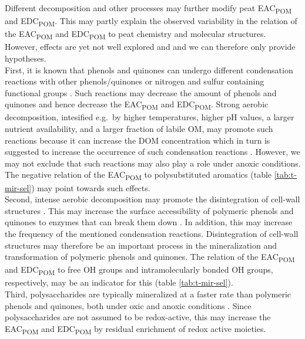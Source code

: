\documentclass[alpha-refs]{wiley-article-rmd}
\begin{document}
\begin{refsection}
Different decomposition and other processes may further modify peat EAC\textsubscript{POM} and EDC\textsubscript{POM}. This may partly explain the observed variability in the relation of the EAC\textsubscript{POM} and EDC\textsubscript{POM} to peat chemistry and molecular structures. However, effects are yet not well explored and and we can therefore only provide hypotheses.\\
First, it is known that phenols and quinones can undergo different condensation reactions with other phenols/quinones \autocite{Hotta.2002,Johnson.2015,Bolton.2018,Zhao.2020} or nitrogen and sulfur containing functional groups \autocite{Bolton.2018,Olk.2006,Heitmann.2006,Yu.2016}. Such reactions may decrease the amount of phenols and quinones and hence decrease the EAC\textsubscript{POM} and EDC\textsubscript{POM}. Strong aerobic decomposition, intesified e.g.~by higher temperatures, higher pH values, a larger nutrient availability, and a larger fraction of labile OM, may promote such reactions because it can increase the DOM concentration \autocite{Bragazza.2007,Fenner.2011,Kang.2018c,Bowring.2020} which in turn is suggested to increase the occurrence of such condensation reactions \autocite{Hotta.2002,Johnson.2015}. However, we may not exclude that such reactions may also play a role under anoxic conditions. The negative relation of the EAC\textsubscript{POM} to polysubstituted aromatics (table \ref{tab:t-mir-sel}) may point towards such effects.\\
Second, intense aerobic decomposition may promote the disintegration of cell-wall structures \autocite{Tsuneda.2001}. This may increase the surface accessibility of polymeric phenols and quinones to enzymes that can break them down \autocite{Tsuneda.2001}. In addition, this may increase the frequency of the mentioned condensation reactions. Disintegration of cell-wall structures may therefore be an important process in the mineralization and transformation of polymeric phenols and quinones. The relation of the EAC\textsubscript{POM} and EDC\textsubscript{POM} to free OH groups and intramolecularly bonded OH groups, respectively, may be an indicator for this (table \ref{tab:t-mir-sel}).\\
Third, polysaccharides are typically mineralized at a faster rate than polymeric phenols and quinones, both under oxic and anoxic conditions \autocite{Benner.1984}. Since polysaccharides are not assumed to be redox-active, this may increase the EAC\textsubscript{POM} and EDC\textsubscript{POM} by residual enrichment of redox active moieties.\\

\end{refsection}
\end{document}
